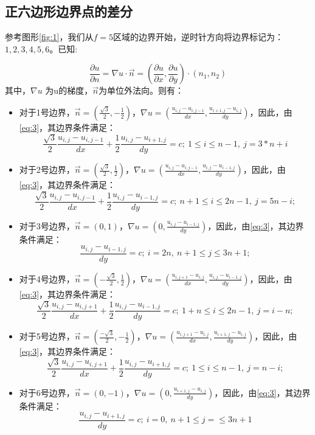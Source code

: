 \documentclass[a4paper,11pt]{ctexart} %
\begin{document}
\subsection{正六边形边界点的差分}
参考图形\ref{fig:1}，我们从$f=5$区域的边界开始，逆时针方向将边界标记为：$1,2,3,4,5,6$。已知:\par
\begin{equation}
\label{eq:3}
\frac{\partial u}{\partial n}=\nabla u \cdot \vec{n}=(\frac{\partial u}{\partial x},\frac{\partial u}{\partial y})\cdot (n_1,n_2) 
\end{equation}
其中，$\nabla u$ 为u的梯度，$\vec{n}$为单位外法向。则有：\par
\begin{itemize}
\item 对于1号边界，$\vec{n}=(\frac{\sqrt{3}}{2},-\frac{1}{2})$，$\nabla u=(\frac{u_{i,j}-u_{i,j-1}}{dx},\frac{u_{i+1,j}-u_{i,j}}{dy})$，因此，由\eqref{eq:3}，其边界条件满足：
\begin{equation*}
\frac{\sqrt{3}}{2}\frac{u_{i,j}-u_{i,j-1}}{dx}+\frac{1}{2}\frac{u_{i,j}-u_{i+1,j}}{dy}=c;\ 1\leq i\leq n-1,\ j=3*n+i
\end{equation*}
\item 对于2号边界，$\vec{n}=(\frac{\sqrt{3}}{2},\frac{1}{2})$，$\nabla u=(\frac{u_{i,j}-u_{i,j-1}}{dx},\frac{u_{i,j}-u_{i-1,j}}{dy})$，因此，由\eqref{eq:3}，其边界条件满足：
\begin{equation*}
\frac{\sqrt{3}}{2}\frac{u_{i,j}-u_{i,j-1}}{dx}+\frac{1}{2}\frac{u_{i,j}-u_{i-1,j}}{dy}=c;\ n+1\leq i\leq 2n-1,\ j=5n-i;
\end{equation*}
\item 对于3号边界，$\vec{n}=(0,1)$，$\nabla u=(0,\frac{u_{i,j}-u_{i-1,j}}{dy})$，因此，由\eqref{eq:3}，其边界条件满足：
\begin{equation*}
\frac{u_{i,j}-u_{i-1,j}}{dy}=c;\ i=2n,\ n+1\leq j\leq 3n+1;
\end{equation*}
\item 对于4号边界，$\vec{n}=(-\frac{\sqrt{3}}{2},\frac{1}{2})$，$\nabla u=(\frac{u_{i,j+1}-u_{i,j}}{dx},\frac{u_{i,j}-u_{i-1,j}}{dy})$，因此，由\eqref{eq:3}，其边界条件满足：
\begin{equation*}
\frac{\sqrt{3}}{2}\frac{u_{i,j}-u_{i,j+1}}{dx}+\frac{1}{2}\frac{u_{i,j}-u_{i-1,j}}{dy}=c;\ 1+n\leq i\leq 2n-1,\ j=i-n;
\end{equation*}
\item 对于5号边界，$\vec{n}=(\frac{-\sqrt{3}}{2},-\frac{1}{2})$，$\nabla u=(\frac{u_{i,j+1}-u_{i,j}}{dx},\frac{u_{i+1,j}-u_{i,j}}{dy})$，因此，由\eqref{eq:3}，其边界条件满足：
\begin{equation*}
\frac{\sqrt{3}}{2}\frac{u_{i,j}-u_{i,j+1}}{dx}+\frac{1}{2}\frac{u_{i,j}-u_{i+1,j}}{dy}=c;\ 1\leq i\leq n-1,\ j=n-i;
\end{equation*}
\item 对于6号边界，$\vec{n}=(0,-1)$，$\nabla u=(0,\frac{u_{i+1,j}-u_{i,j}}{dy})$，因此，由\eqref{eq:3}，其边界条件满足：
\begin{equation*}
\frac{u_{i,j}-u_{i+1,j}}{dy}=c;\ i=0,\ n+1\leq j=\leq 3n+1
\end{equation*}
\end{itemize}
\end{document}

